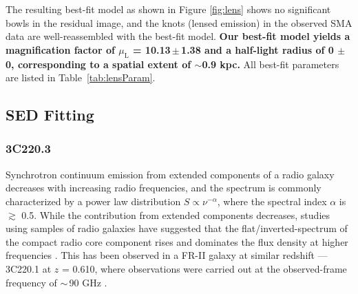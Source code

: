 \documentclass[iop, revtex4]{emulateapj}
\newcommand{\Msun}{\mbox{$M_{\odot}$}}
\begin{document}
The resulting best-fit model as shown in Figure\,\,\ref{fig:lens} shows no significant bowls in the residual
image, and the knots (lensed emission) in the observed SMA data are well-reassembled with the best-fit model.
{\bf  Our best-fit model yields a magnification
factor of $\mu_\textrm{L}$ = 10.13\,$\pm$\,1.38
and a half-light radius of 0 $\pm$ 0, corresponding to a spatial extent of $\sim$0.9 kpc.} 
All best-fit
parameters are listed in Table~\ref{tab:lensParam}. 


\subsection{SED Fitting} \label{sec:SED}
\subsubsection{3C220.3}\label{sec:SEDFg}
Synchrotron continuum emission from extended components of a radio galaxy decreases with increasing radio frequencies,
and the spectrum is commonly characterized by a power law distribution $S \propto \nu^{-\alpha}$, where the
spectral index $\alpha$ is $\gtrsim$ 0.5. While the contribution from extended components decreases, studies using
samples of radio galaxies have suggested that the flat/inverted-spectrum of the compact radio core component rises
and dominates the flux density at higher frequencies \citep{Kellermann81a,Begelman84a}. This has been observed in a FR-II galaxy at similar redshift --- 3C220.1 at $z$ = 0.610, where observations were carried out at the observed-frame frequency of $\sim$\,90 GHz \citep{Hardcastle08a}.
\end{document}
